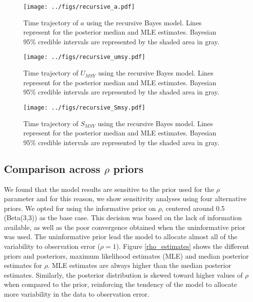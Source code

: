 \documentclass{article}
\begin{document}


\begin{figure}[h]
  \centering
  \texttt{[image: ../figs/recursive\_a.pdf]}
  \caption{Time trajectory of $a$ using the recursive Bayes model. Lines represent for the posterior median and MLE estimates. Bayesian 95\% credible intervals are represented by the shaded area in gray. }
\label{rec_alpha}
\end{figure}


\begin{figure}[h]
  \centering
  \texttt{[image: ../figs/recursive\_umsy.pdf]}
  \caption{Time trajectory of $U_{MSY}$ using the recursive Bayes model. Lines represent for the posterior median and MLE estimates. Bayesian 95\% credible intervals are represented by the shaded area in gray.}
\label{rec_umsy}
\end{figure}

\begin{figure}[h]
  \centering
  \texttt{[image: ../figs/recursive\_Smsy.pdf]}
  \caption{Time trajectory of $S_{MSY}$ using the recursive Bayes model. Lines represent for the posterior median and MLE estimates. Bayesian 95\% credible intervals are represented by the shaded area in gray.}
\label{rec_smsy}
\end{figure}

\subsection{Comparison across $\rho$ priors}

We found that the model results are sensitive to the prior used for the $\rho$ parameter and for this reason, we show sensitivity analyses using four alternative priors.  We opted for using the informative prior on $\rho$, centered around 0.5 (Beta(3,3)) as the base case. This decision was based on the lack of information available, as well as the poor convergence obtained when the uninformative prior was used. The uninformative prior lead the model to allocate almost all of the variability to observation error ($\rho = 1$). Figure \ref{rho_estimates} shows the different priors and posteriors, maximum likelihood estimates (MLE) and median posterior estimates for $\rho$. MLE estimates are always higher than the median posterior estimates. Similarly, the posterior distribution is skewed toward higher values of $\rho$ when compared to the prior, reinforcing the tendency of the model to allocate more variability in the data to observation error.
\end{document}

